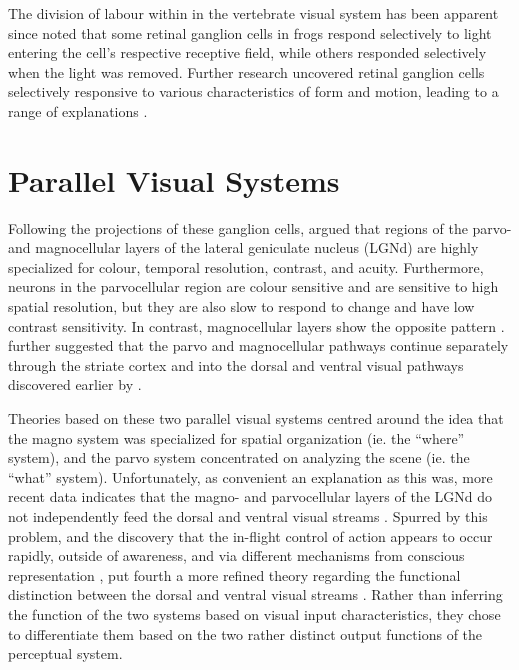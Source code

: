 The division of labour within in the vertebrate visual system has been apparent since  noted that some retinal ganglion cells in frogs respond selectively to light entering the cell's respective receptive field, while others responded selectively when the light was removed. Further research uncovered retinal ganglion cells selectively responsive to various characteristics of form and motion, leading to a range of explanations \cite{schiller1986}.

\section*{Parallel Visual Systems}
Following the projections of these ganglion cells,  argued that regions of the parvo- and magnocellular layers of the lateral geniculate nucleus (LGNd) are highly specialized for colour, temporal resolution, contrast, and acuity. Furthermore, neurons in the parvocellular region are colour sensitive and are sensitive to high spatial resolution, but they are also slow to respond to change and have low contrast sensitivity. In contrast, magnocellular layers show the opposite pattern \cite{Livingstone1988}.  further suggested that the parvo and magnocellular pathways continue separately through the striate cortex and into the dorsal and ventral visual pathways discovered earlier by . %


Theories based on these two parallel visual systems centred around the idea that the magno system was specialized for spatial organization (ie. the ``where'' system), and the parvo system concentrated on analyzing the scene (ie. the ``what'' system). Unfortunately, as convenient an explanation as this was, more recent data indicates that the magno- and parvocellular layers of the LGNd do not independently feed the dorsal and ventral visual streams \cite{schiller1990}. Spurred by this problem, and the discovery that the in-flight control of action appears to occur rapidly, outside of awareness, and via different mechanisms from conscious representation , put fourth a more refined theory regarding the functional distinction between the dorsal and ventral visual streams \cite{milner1995vba}. Rather than inferring the function of the two systems based on visual input characteristics, they chose to differentiate them based on the two rather distinct output functions of the perceptual system.

